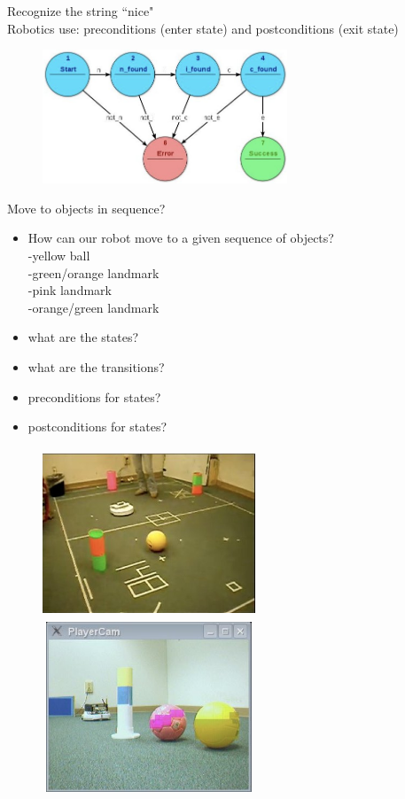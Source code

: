 Recognize the string ``nice"\\
Robotics use: preconditions (enter state) and postconditions (exit state)\\

\begin{figure}[!h]
\centering
\includegraphics[width=0.65\textwidth]{figures/6_nice_fsm.jpg}
\end{figure}

Move to objects in sequence?\\
\begin{itemize}
\item How can our robot move to a given sequence of objects?\\
-yellow ball\\
-green/orange landmark\\
-pink landmark\\
-orange/green landmark\\
\item what are the states?
\item what are the transitions?
\item preconditions for states?
\item postconditions for states?
\end{itemize}

\begin{figure}[!h]
\centerline{
\mbox{\includegraphics[height=2.0in,width=2.5in]{figures/6_move_to_objs1.jpg}}
\mbox{\includegraphics[height=2.0in,width=2.5in]{figures/6_move_to_objs2.jpg}}
}
\end{figure}

